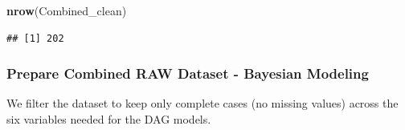 \documentclass[
]{article}
\newenvironment{Shaded}{\begin{snugshade}}{\end{snugshade}}
\newcommand{\FunctionTok}[1]{\textcolor[rgb]{0.13,0.29,0.53}{\textbf{#1}}}
\newcommand{\NormalTok}[1]{#1}
\begin{document}
\begin{Shaded}
\begin{Highlighting}[]
\FunctionTok{nrow}\NormalTok{(Combined\_clean)}
\end{Highlighting}
\end{Shaded}

\begin{verbatim}
## [1] 202
\end{verbatim}

\subsubsection{Prepare Combined RAW Dataset - Bayesian
Modeling}\label{prepare-combined-raw-dataset---bayesian-modeling}

We filter the dataset to keep only complete cases (no missing values)
across the six variables needed for the DAG models.
\end{document}
